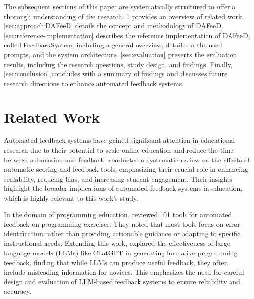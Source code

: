 \documentclass[manuscript,screen,review, anonymous]{acmart}
\begin{document}
The subsequent sections of this paper are systematically structured to offer a thorough understanding of the research.
\cref{sec:related-work} provides an overview of related work. 
\cref{sec:approach:DAFeeD} details the concept and methodology of DAFeeD.
\cref{sec:reference-implementation} describes the reference implementation of DAFeeD, called FeedbackSystem, including a general overview, details on the used prompts, and the system architecture. 
\cref{sec:evaluation} presents the evaluation results, including the research questions, study design, and findings. 
Finally, \cref{sec:conclusion} concludes with a summary of findings and discusses future research directions to enhance automated feedback systems.

\section{Related Work} %
\label{sec:related-work}

Automated feedback systems have gained significant attention in educational research due to their potential to scale online education and reduce the time between submission and feedback.
\citet{hahn:2021:SystematicReviewEffects} conducted a systematic review on the effects of automatic scoring and feedback tools, emphasizing their crucial role in enhancing scalability, reducing bias, and increasing student engagement.
Their insights highlight the broader implications of automated feedback systems in education, which is highly relevant to this work's study.


%
In the domain of programming education, \citet{keuning:2018:SystematicLiteratureReview} reviewed 101 tools for automated feedback on programming exercises.
They noted that most tools focus on error identification rather than providing actionable guidance or adapting to specific instructional needs.
Extending this work, \citet{kiesler:2023:ExploringPotentialLarge} explored the effectiveness of large language models (LLMs) like ChatGPT in generating formative programming feedback, finding that while LLMs can produce useful feedback, they often include misleading information for novices.
This emphasizes the need for careful design and evaluation of LLM-based feedback systems to ensure reliability and accuracy.
\end{document}

